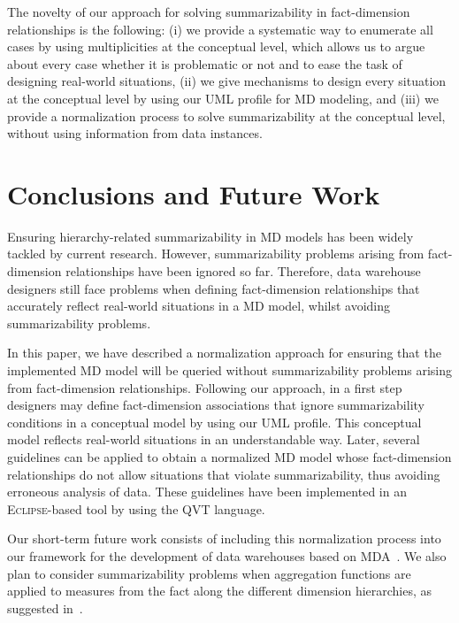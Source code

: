The novelty of our approach for solving summarizability in
fact-dimension relationships is the following: (i) we provide a
systematic way to enumerate all cases by using multiplicities at the
conceptual level, which allows us to argue about every case whether
it is problematic or not and to ease the task of designing
real-world situations, (ii) we give mechanisms to design every
situation at the conceptual level by using our UML profile for MD
modeling, and (iii) we provide a normalization process to solve
summarizability at the conceptual level, without using information
from data instances.


\section{Conclusions and Future Work}
\label{a3:sect:conclusions} Ensuring hierarchy-related
summarizability in MD models has been widely tackled by current
research. However, summarizability problems arising from
fact-dimension relationships have been ignored so far. Therefore,
data warehouse designers still face problems when defining
fact-dimension relationships that accurately reflect real-world
situations in a MD model, whilst avoiding summarizability problems.

In this paper, we have described a normalization approach for
ensuring that the implemented MD model will be queried without
summarizability problems arising from fact-dimen\-sion
relationships. Following our approach, in a first step designers may
define fact-dimension associations that ignore summarizability
conditions in a conceptual model by using our UML profile. This
conceptual model reflects real-world situations in an understandable
way. Later, several guidelines can be applied to obtain a normalized
MD model whose fact-dimension relationships do not allow situations
that violate summarizability, thus avoiding erroneous analysis of
data. These guidelines have been implemented in an
\textsc{Eclipse}-based tool by using the QVT language.

Our short-term future work consists of including this normalization
process into our framework for the development of data warehouses
based on MDA~\cite{journals/dke/Mazon2007,journals/dss/Mazon2008}.
We also plan to consider summarizability problems when aggregation
functions are applied to measures from the fact along the different
dimension hierarchies, as suggested
in~\cite{DBLP:conf/er/CherfiP03,DBLP:conf/er/HornerS05}.


